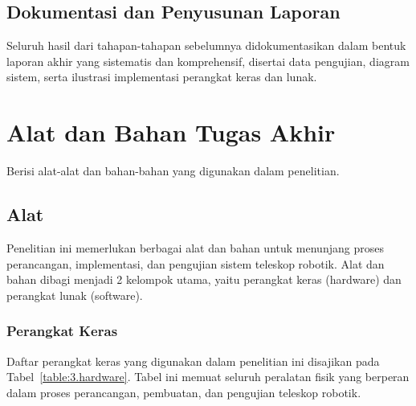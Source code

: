 \subsection{Dokumentasi dan Penyusunan Laporan} \label{III.Langkah10}
Seluruh hasil dari tahapan-tahapan sebelumnya didokumentasikan dalam bentuk laporan akhir yang sistematis dan komprehensif, disertai data pengujian, diagram sistem, serta ilustrasi implementasi perangkat keras dan lunak. \par


\section{Alat dan Bahan Tugas Akhir} \label{III.Alat dan Bahan}
Berisi alat-alat dan bahan-bahan yang digunakan dalam penelitian. \par

\subsection{Alat} \label{III.Alat}
Penelitian ini memerlukan berbagai alat dan bahan untuk menunjang proses perancangan, implementasi, dan pengujian sistem teleskop robotik. Alat dan bahan dibagi menjadi 2 kelompok utama, yaitu perangkat keras (hardware) dan perangkat lunak (software).\par
\subsubsection{Perangkat Keras} \label{III.Alat.Keras}
Daftar perangkat keras yang digunakan dalam penelitian ini disajikan pada Tabel~\ref{table:3.hardware}. Tabel ini memuat seluruh peralatan fisik yang berperan dalam proses perancangan, pembuatan, dan pengujian teleskop robotik.

\renewcommand{\arraystretch}{1.2} %
\setlength{\tabcolsep}{6pt} %

